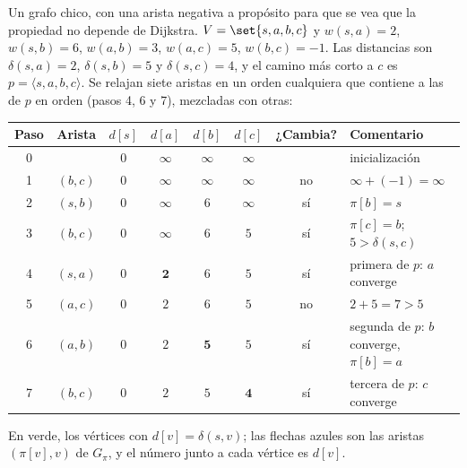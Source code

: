 \documentclass[11pt,letterpaper]{article}
\begin{document}
\begin{ejemplo}
  \label{ej:caminos-relajacion}
  Un grafo chico, con una arista negativa a propósito para que se vea
  que la propiedad no depende de Dijkstra. $V = \set{s, a, b, c}$ y
  $w(s, a) = 2$, $w(s, b) = 6$, $w(a, b) = 3$, $w(a, c) = 5$,
  $w(b, c) = -1$. Las distancias son $\delta(s, a) = 2$,
  $\delta(s, b) = 5$ y $\delta(s, c) = 4$, y el camino más corto a $c$
  es $p = \langle s, a, b, c \rangle$. Se relajan siete aristas en un
  orden cualquiera que contiene a las de $p$ en orden (pasos 4, 6
  y 7), mezcladas con otras:
  \begin{center}
  \small
  \begin{tabular}{cccccccl}
    \toprule
    \textbf{Paso} & \textbf{Arista} & $d[s]$ & $d[a]$ & $d[b]$
      & $d[c]$ & \textbf{¿Cambia?} & \textbf{Comentario} \\
    \midrule
    0 & & $0$ & $\infty$ & $\infty$ & $\infty$ & & inicialización \\
    1 & $(b, c)$ & $0$ & $\infty$ & $\infty$ & $\infty$ & no
      & $\infty + (-1) = \infty$ \\
    2 & $(s, b)$ & $0$ & $\infty$ & $6$ & $\infty$ & sí
      & $\pi[b] = s$ \\
    3 & $(b, c)$ & $0$ & $\infty$ & $6$ & $5$ & sí
      & $\pi[c] = b$; $5 > \delta(s, c)$ \\
    4 & $(s, a)$ & $0$ & $\mathbf{2}$ & $6$ & $5$ & sí
      & primera de $p$: $a$ converge \\
    5 & $(a, c)$ & $0$ & $2$ & $6$ & $5$ & no & $2 + 5 = 7 > 5$ \\
    6 & $(a, b)$ & $0$ & $2$ & $\mathbf{5}$ & $5$ & sí
      & segunda de $p$: $b$ converge, $\pi[b] = a$ \\
    7 & $(b, c)$ & $0$ & $2$ & $5$ & $\mathbf{4}$ & sí
      & tercera de $p$: $c$ converge \\
    \bottomrule
  \end{tabular}
  \end{center}
  En verde, los vértices con $d[v] = \delta(s, v)$; las flechas
  azules son las aristas $(\pi[v], v)$ de $G_\pi$, y el número junto a
  cada vértice es $d[v]$.
  \begin{center}
\end{center}
\end{ejemplo}
\end{document}
